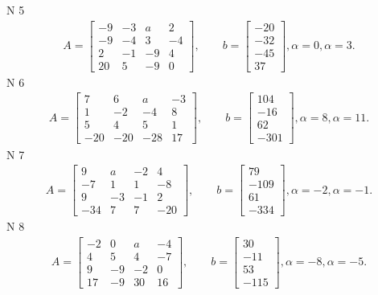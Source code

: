 \documentclass[11pt]{report}
\begin{document}
N 5
\begin{align*}
 A = \left[\begin{matrix}-9 & -3 & a & 2\\-9 & -4 & 3 & -4\\2 & -1 & -9 & 4\\20 & 5 & -9 & 0\end{matrix}\right],
    \qquad b = \left[\begin{matrix}-20\\-32\\-45\\37\end{matrix}\right], \alpha = 0, \alpha = 3. 
 \end{align*}
N 6
\begin{align*}
 A = \left[\begin{matrix}7 & 6 & a & -3\\1 & -2 & -4 & 8\\5 & 4 & 5 & 1\\-20 & -20 & -28 & 17\end{matrix}\right],
    \qquad b = \left[\begin{matrix}104\\-16\\62\\-301\end{matrix}\right], \alpha = 8, \alpha = 11. 
 \end{align*}
N 7
\begin{align*}
 A = \left[\begin{matrix}9 & a & -2 & 4\\-7 & 1 & 1 & -8\\9 & -3 & -1 & 2\\-34 & 7 & 7 & -20\end{matrix}\right],
    \qquad b = \left[\begin{matrix}79\\-109\\61\\-334\end{matrix}\right], \alpha = -2, \alpha = -1. 
 \end{align*}
N 8
\begin{align*}
 A = \left[\begin{matrix}-2 & 0 & a & -4\\4 & 5 & 4 & -7\\9 & -9 & -2 & 0\\17 & -9 & 30 & 16\end{matrix}\right],
    \qquad b = \left[\begin{matrix}30\\-11\\53\\-115\end{matrix}\right], \alpha = -8, \alpha = -5. 
 \end{align*}
\end{document}
